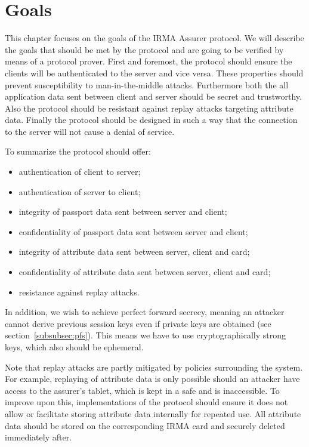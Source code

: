 \section{Goals}
\label{sec:goals}
This chapter focuses on the goals of the IRMA Assurer protocol. We will describe the goals that should be met by the protocol and are going to be verified by means of a protocol prover. First and foremost, the protocol should ensure the clients will be authenticated to the server and vice versa. These properties should prevent susceptibility to man-in-the-middle attacks. Furthermore both the all application data sent between client and server should be secret and trustworthy. Also the protocol should be resistant against replay attacks targeting attribute data. Finally the protocol should be designed in such a way that the connection to the server will not cause a denial of service.

To summarize the protocol should offer:
\begin{itemize}
  \item authentication of client to server;
  \item authentication of server to client;
  \item integrity of passport data sent between server and client;
  \item confidentiality of passport data sent between server and client;
  \item integrity of attribute data sent between server, client and card;
  \item confidentiality of attribute data sent between server, client and card;
  \item resistance against replay attacks.
\end{itemize}

In addition, we wish to achieve perfect forward secrecy, meaning an attacker cannot derive previous session keys even if private keys are obtained (see section~\ref{subsubsec:pfs}). This means we have to use cryptographically strong keys, which also should be ephemeral.

Note that replay attacks are partly mitigated by policies surrounding the system. For example, replaying of attribute data is only possible should an attacker have access to the assurer's tablet, which is kept in a safe and is inaccessible. To improve upon this, implementations of the protocol should ensure it does not allow or facilitate storing attribute data internally for repeated use. All attribute data should be stored on the corresponding IRMA card and securely deleted immediately after.

